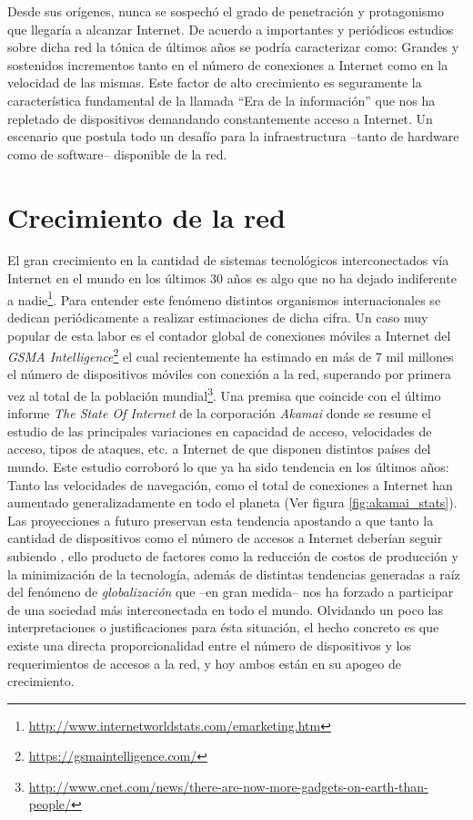 \begin{intro}
Desde sus orígenes, nunca se sospechó el grado de penetración y protagonismo que llegaría a alcanzar Internet. De acuerdo a importantes y periódicos estudios sobre dicha red \cite{report:akamai} la tónica de últimos años se podría caracterizar como: Grandes y sostenidos incrementos tanto en el número de conexiones a Internet como en la velocidad de las mismas. Este factor de alto crecimiento es seguramente la característica fundamental de la llamada ``Era de la información'' que nos ha repletado de dispositivos demandando constantemente acceso a Internet. Un escenario que postula todo un desafío para la infraestructura --tanto de hardware como de software-- disponible de la red.

\section*{Crecimiento de la red}
El gran crecimiento en la cantidad de sistemas tecnológicos interconectados vía Internet en el mundo en los últimos 30 años es algo que no ha dejado indiferente a nadie\footnote{\url{http://www.internetworldstats.com/emarketing.htm}}. Para entender este fenómeno distintos organismos internacionales se dedican periódicamente a realizar estimaciones de dicha cifra. Un caso muy popular de esta labor es el contador global de conexiones móviles a Internet del \emph{GSMA Intelligence}\footnote{\url{https://gsmaintelligence.com/}} el cual recientemente ha estimado en más de 7 mil millones el número de dispositivos móviles con conexión a la red, superando por primera vez al total de la población mundial\footnote{\url{http://www.cnet.com/news/there-are-now-more-gadgets-on-earth-than-people/}}. Una premisa que coincide con el último informe \emph{The State Of Internet} de la corporación \emph{Akamai} \cite{report:akamai} donde se resume el estudio de las principales variaciones en capacidad de acceso, velocidades de acceso, tipos de ataques, etc. a Internet de que disponen distintos países del mundo. Este estudio corroboró lo que ya ha sido tendencia en los últimos años: Tanto las velocidades de navegación, como el total de conexiones a Internet han aumentado generalizadamente en todo el planeta (Ver figura \ref{fig:akamai_stats}). Las proyecciones a futuro preservan esta tendencia apostando a que tanto la cantidad de dispositivos como el número de accesos a Internet deberían seguir subiendo \cite{nota:2020}, ello producto de factores como la reducción de costos de producción y la minimización de la tecnología, además de distintas tendencias generadas a raíz del fenómeno de \emph{globalización} que --en gran medida-- nos ha forzado a participar de una sociedad más interconectada en todo el mundo. Olvidando un poco las interpretaciones o justificaciones para ésta situación, el hecho concreto es que existe una directa proporcionalidad entre el número de dispositivos y los requerimientos de accesos a la red, y hoy ambos están en su apogeo de crecimiento.


\end{intro}
